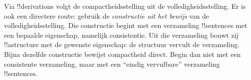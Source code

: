 \documentclass[../../../include/open-logic-section]{subfiles}
\begin{document}
Via !!{derivation}s volgt de compactheidsstelling uit de
volledigheidsstelling. Er is ook een directere route: gebruik de
\emph{constructie uit het bewijs} van de volledigheidsstelling. Die
constructie begint met een verzameling !!{sentence}s met een bepaalde
eigenschap, namelijk consistentie. Uit die verzameling bouwt zij
!!a{structure} met de gewenste eigenschap: de structuur vervult de
verzameling. Bijna dezelfde constructie bewijst compactheid direct.
Begin dan niet met een consistente verzameling, maar met een ``eindig
vervulbare'' verzameling !!{sentence}s.
\end{document}
